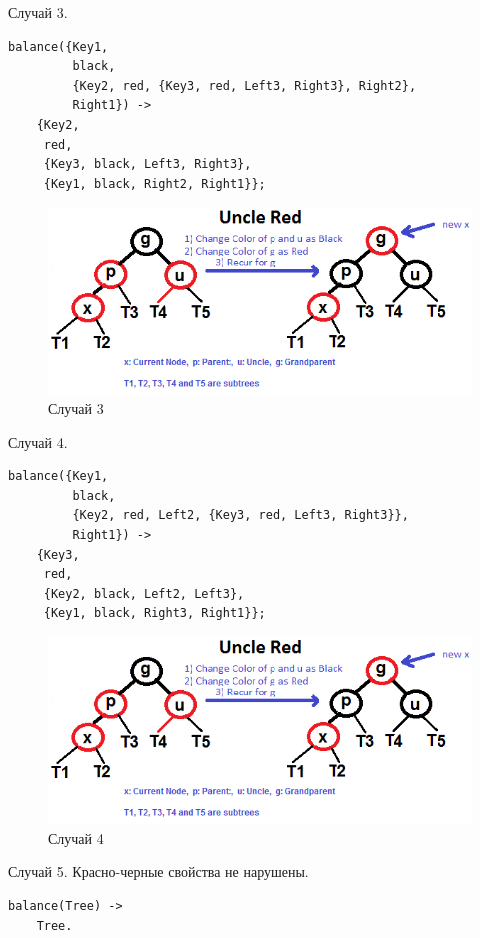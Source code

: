 			Случай 3.
			\begin{lstlisting}
balance({Key1, 
         black, 
         {Key2, red, {Key3, red, Left3, Right3}, Right2}, 
         Right1}) ->  
    {Key2, 
     red, 
     {Key3, black, Left3, Right3}, 
     {Key1, black, Right2, Right1}};	    
			\end{lstlisting}
			\begin{figure}[H]
				\centering
				\includegraphics[width=\textwidth]{img/tan-aus.png}
				\caption{Случай 3}
			\end{figure}
			
			Случай 4.
			\begin{lstlisting}
balance({Key1, 
         black, 
         {Key2, red, Left2, {Key3, red, Left3, Right3}}, 
         Right1}) ->   
    {Key3, 
     red, 
     {Key2, black, Left2, Left3}, 
     {Key1, black, Right3, Right1}};	    
			\end{lstlisting}
			\begin{figure}[H]
				\centering
				\includegraphics[width=\textwidth]{img/tan-aus.png}
				\caption{Случай 4}
			\end{figure}
			
			Случай 5. Красно-черные свойства не нарушены.
			\begin{lstlisting}
balance(Tree) -> 
    Tree.	
			\end{lstlisting}
			
